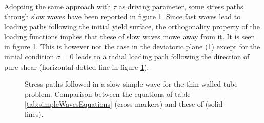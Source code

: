 Adopting the same approach with $\tau$ as driving parameter, some stress paths through slow waves have been reported in figure \ref{fig:tw_slow}.
Since fast waves lead to loading paths following the initial yield surface, the orthogonality property of the loading functions implies that these of slow waves mowe away from it.
It is seen in figure \ref{fig:tw_slow}.
This is however not the case in the deviatoric plane (\ref{fig:tw_slow}) except for the initial condition $\sigma=0$ leads to a radial loading path following the direction of pure shear (horizontal dotted line in figure \ref{fig:tw_slow}).
\begin{figure}[h!]
  \centering
   \qquad
  \caption{Stress paths followed in a slow simple wave for the thin-walled tube problem. Comparison between the equations of table \ref{tab:simpleWavesEquations} (cross markers) and these of \cite{Clifton} (solid lines).}
  \label{fig:tw_slow}
\end{figure}


